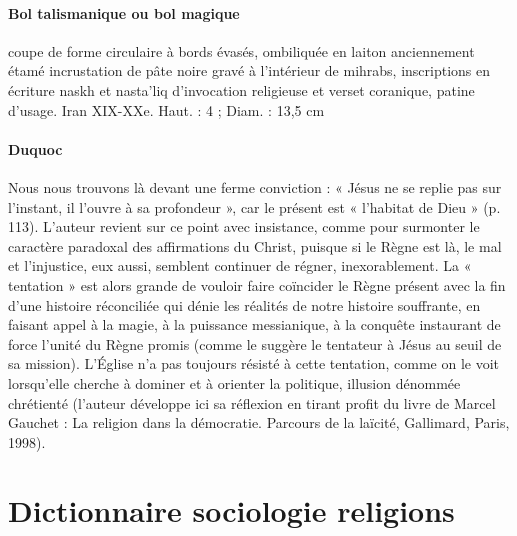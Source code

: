 \paragraph{Bol talismanique ou bol magique} coupe de forme circulaire à bords évasés, ombiliquée en laiton anciennement étamé incrustation de pâte noire gravé à l'intérieur de mihrabs, inscriptions en écriture naskh et nasta'liq d'invocation religieuse et verset coranique, patine d'usage. Iran XIX-XXe.
Haut. : 4 ; Diam. : 13,5 cm




\paragraph{Duquoc} Nous nous trouvons là devant une ferme conviction : « Jésus ne se replie pas sur l’instant, il l’ouvre à sa profondeur », car le présent est « l’habitat de Dieu » (p. 113). L’auteur revient sur ce point avec insistance, comme pour surmonter le caractère paradoxal des affirmations du Christ, puisque si le Règne est là, le mal et l’injustice, eux aussi, semblent continuer de régner, inexorablement. La « tentation » est alors grande de vouloir faire coïncider le Règne présent avec la fin d’une histoire réconciliée qui dénie les réalités de notre histoire souffrante, en faisant appel à la magie, à la puissance messianique, à la conquête instaurant de force l’unité du Règne promis (comme le suggère le tentateur à Jésus au seuil de sa mission). L’Église n’a pas toujours résisté à cette tentation, comme on le voit lorsqu’elle cherche à dominer et à orienter la politique, illusion dénommée chrétienté (l’auteur développe ici sa réflexion en tirant profit du livre de Marcel Gauchet : La religion dans la démocratie. Parcours de la laïcité, Gallimard, Paris, 1998).  

\section{Dictionnaire sociologie religions}

